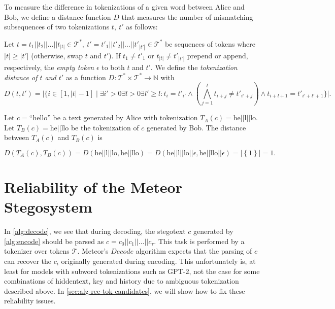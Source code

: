 To measure the difference in tokenizations of a given word between Alice and Bob, we define a distance function $D$ that measures the number of mismatching subsequences of two tokenizations $t,~ t'$ as follows:

\begin{definition}
Let $t = t_1 || t_2 || \dots || t_{|t|} \in \mathcal{T}^*,~ t' = t'_1 || t'_2 || \dots || t'_{|t'|} \in \mathcal{T}^*$ be sequences of tokens where $|t| \geq |t'|$ (otherwise, swap $t$ and $t'$).
If $t_1 \neq t'_1$ or $t_{|t|} \neq t'_{|t'|}$ prepend or append, respectively, the \emph{empty token} $\epsilon$ to both $t$ and $t'$.
We define the \emph{tokenization distance of $t$ and $t'$} as a function $D \colon \mathcal{T}^* \times \mathcal{T}^* \rightarrow \mathbb{N}$ with
$$D(t, t') = \big| \big\{ i \in [1, |t|-1] \mid \exists i' > 0 \exists l > 0 \exists l' \geq l: t_{i} = t'_{i'} \land \left( \bigwedge_{j=1}^{l} t_{i+j} \neq t'_{i'+j} \right) \land t_{i+l+1} = t'_{i'+l'+1} \big\} \big|.$$
\end{definition}

\begin{example}
Let $c = \textrm{``hello''}$ be a text generated by Alice with tokenization $T_A(c) = \textrm{he}||\textrm{l}||\textrm{lo}$.
Let $T_B(c) = \textrm{he}||\textrm{llo}$ be the tokenization of $c$ generated by Bob.
The distance between $T_A(c)$ and $T_B(c)$ is 

$$
D(T_A(c), T_B(c))
= D(\textrm{he}||\textrm{l}||\textrm{lo}, \textrm{he}||\textrm{llo})
= D(\textrm{he}||\textrm{l}||\textrm{lo}||\epsilon, \textrm{he}||\textrm{llo}||\epsilon)
= \left| \left\{ 1 \right\} \right| = 1.
$$
\end{example}

\section{Reliability of the Meteor Stegosystem}

In \autoref{alg:decode}, we see that during decoding, the stegotext $c$ generated by \autoref{alg:encode} should be parsed as $c = c_0 ||c_1 || \dots || c_{\tau}$.
This task is performed by a tokenizer over tokens $\mathcal{T}$.
Meteor's $Decode$ algorithm expects that the parsing of $c$ can recover the $c_i$ originally generated during encoding.
This unfortunately is, at least for models with subword tokenizations such as GPT-2, not the case for some combinations of hiddentext, key and history due to ambiguous tokenization described above.
In \autoref{sec:alg-rec-tok-candidates}, we will show how to fix these reliability issues.


